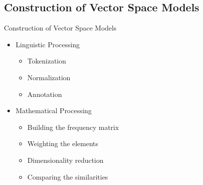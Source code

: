 \subsection{Construction of Vector Space Models}
\begin{frame}{Construction of Vector Space Models}
	\begin{itemize}
	\item Linguistic Processing
		\begin{itemize}
		\item Tokenization
		\item Normalization
		\item Annotation
		\end{itemize}
	\item Mathematical Processing\cite{Lowe2001}
		\begin{itemize}
		\item Building the frequency matrix
		\item Weighting the elements
		\item Dimensionality reduction
		\item Comparing the similarities
		\end{itemize}
	\end{itemize}
\end{frame}